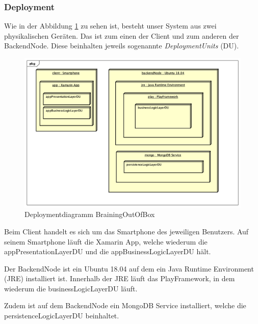 \subsubsection{Deployment}
Wie in der Abbildung \ref{fig:deployment-methode635} zu sehen ist, besteht unser System aus zwei physikalischen Geräten. Das ist zum einen der Client und zum anderen der BackendNode. Diese beinhalten jeweils sogenannte \textit{DeploymentUnits} (DU). 

\begin{figure}[h]
	\centering
	\includegraphics[width=1\linewidth]{img/deployment/DD_Methode635}
	\caption{Deploymentdiagramm BrainingOutOfBox}
	\label{fig:deployment-methode635}
\end{figure}

Beim Client handelt es sich um das Smartphone des jeweiligen Benutzers. Auf seinem Smartphone läuft die Xamarin App, welche wiederum die appPresentationLayerDU und die appBusinessLogicLayerDU hält.

Der BackendNode ist ein Ubuntu 18.04 auf dem ein Java Runtime Environment (JRE) installiert ist. Innerhalb der JRE läuft das PlayFramework, in dem wiederum die businessLogicLayerDU läuft.

Zudem ist auf dem BackendNode ein MongoDB Service installiert, welche  die persistenceLogicLayerDU beinhaltet.

